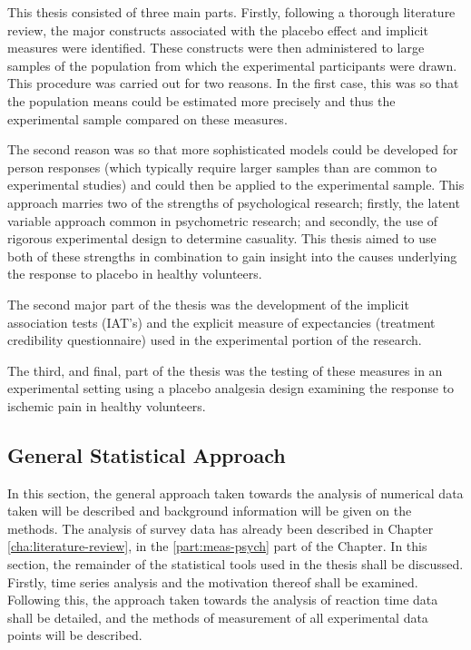This thesis consisted of three main parts. Firstly, following a thorough literature review, the major constructs associated with the placebo effect and implicit measures were identified. These constructs were then administered to large samples of the population from which the experimental participants were drawn. This procedure was carried out for two reasons. In the first case, this was so that the population means could be estimated more precisely and thus the experimental sample compared on these measures.  

The second reason was so that more sophisticated models could be developed for person responses (which typically require larger samples than are common to experimental studies) and could then be applied to the experimental sample. This approach marries two of the strengths of psychological research; firstly, the latent variable approach common in psychometric research; and secondly, the use of rigorous experimental design to determine casuality. This thesis aimed to use both of these strengths in combination to gain insight into the causes underlying the response to placebo in healthy volunteers.

The second major part of the thesis was the development of the implicit association tests (IAT's) and the explicit measure of expectancies (treatment credibility questionnaire) used in the experimental portion of the research. 

The third, and final, part of the thesis was the testing of these measures in an experimental setting using a placebo analgesia design examining the response to ischemic pain in healthy volunteers. 

\subsection{General Statistical Approach}

In this section, the general approach taken towards the analysis of numerical data taken will be described and background information will be given on the methods.
The analysis of survey data has already been described in Chapter \ref{cha:literature-review}, in the \ref{part:meas-psych} part of the Chapter. In this section, the remainder of the statistical tools used in the thesis shall be discussed.  Firstly, time series analysis and the motivation thereof shall be examined.   Following this, the approach taken towards the analysis of reaction time data shall be detailed, and the methods of measurement of all experimental data points will be described.



